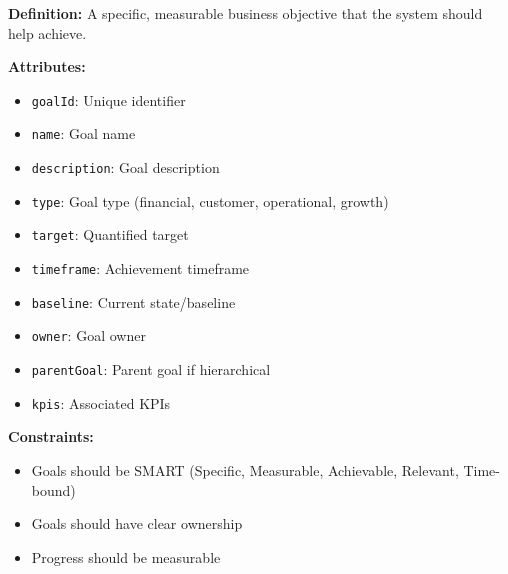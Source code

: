 \documentclass[11pt,letterpaper]{article}
\begin{document}
\begin{definitionbox}
\textbf{Definition:} A specific, measurable business objective that the system should help achieve.

\textbf{Attributes:}
\begin{itemize}[nosep]
    \item \texttt{goalId}: Unique identifier
    \item \texttt{name}: Goal name
    \item \texttt{description}: Goal description
    \item \texttt{type}: Goal type (financial, customer, operational, growth)
    \item \texttt{target}: Quantified target
    \item \texttt{timeframe}: Achievement timeframe
    \item \texttt{baseline}: Current state/baseline
    \item \texttt{owner}: Goal owner
    \item \texttt{parentGoal}: Parent goal if hierarchical
    \item \texttt{kpis}: Associated KPIs
\end{itemize}

\textbf{Constraints:}
\begin{itemize}[nosep]
    \item Goals should be SMART (Specific, Measurable, Achievable, Relevant, Time-bound)
    \item Goals should have clear ownership
    \item Progress should be measurable
\end{itemize}
\end{definitionbox}
\end{document}
